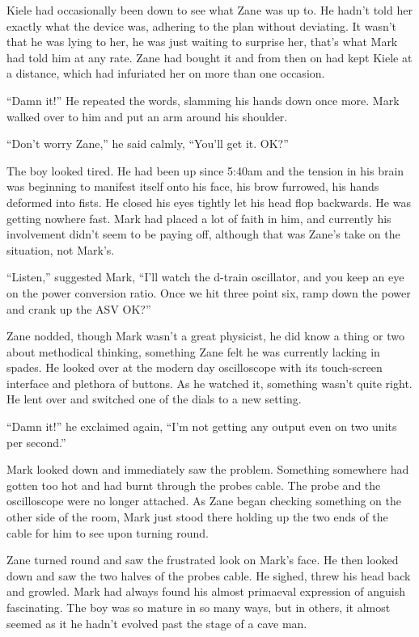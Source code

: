Kiele had occasionally been down to see what Zane was up to.  He hadn't told her exactly what the device was, adhering to the plan without deviating.  It wasn't that he was lying to her, he was just waiting to surprise her, that's what Mark had told him at any rate.  Zane had bought it and from then on had kept Kiele at a distance, which had infuriated her on more than one occasion.

``Damn it!''  He repeated the words, slamming his hands down once more.  Mark walked over to him and put an arm around his shoulder.  

``Don't worry Zane,'' he said calmly, ``You'll get it.  OK?''

The boy looked tired.  He had been up since 5:40am and the tension in his brain was beginning to manifest itself onto his face, his brow furrowed, his hands deformed into fists.  He closed his eyes tightly let his head flop backwards.  He was getting nowhere fast.  Mark had placed a lot of faith in him, and currently his involvement didn't seem to be paying off, although that was Zane's take on the situation, not Mark's.

``Listen,'' suggested Mark, ``I'll watch the d-train oscillator, and you keep an eye on the power conversion ratio.  Once we hit three point six, ramp down the power and crank up the ASV OK?''

Zane nodded, though Mark wasn't a great physicist, he did know a thing or two about methodical thinking, something Zane felt he was currently lacking in spades.  He looked over at the modern day oscilloscope with its touch-screen interface and plethora of buttons.  As he watched it, something wasn't quite right.  He lent over and switched one of the dials to a new setting.

``Damn it!'' he exclaimed again, ``I'm not getting any output even on two units per second.''

Mark looked down and immediately saw the problem.  Something somewhere had gotten too hot and had burnt through the probes cable.  The probe and the oscilloscope were no longer attached.  As Zane began checking something on the other side of the room, Mark just stood there holding up the two ends of the cable for him to see upon turning round.  

Zane turned round and saw the frustrated look on Mark's face.  He then looked down and saw the two halves of the probes cable.  He sighed, threw his head back and growled.  Mark had always found his almost primaeval expression of anguish fascinating.  The boy was so mature in so many ways, but in others, it almost seemed as it he hadn't evolved past the stage of a cave man.  

